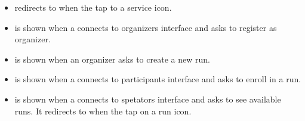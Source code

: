 \documentclass[../DD.tex]{subfiles}
\begin{document}
\begin{itemize}
		\item{ redirects to  when the  tap to a service icon.}
		\item{ is shown when a  connects to organizers interface and asks to register as organizer.}
		\item{ is shown when an organizer asks to create a new run.}
		\item{ is shown when a  connects to participants interface and asks to enroll in a run.}
		\item{ is shown when a  connects to spetators interface and asks to see available runs. It redirects to  when the  tap on a run icon.}
	\end{itemize}
\thispagestyle{fancy}
 
\end{document}
